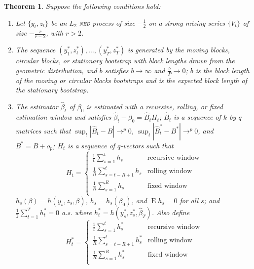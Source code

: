 \documentclass[11pt,fleqn]{article}
\newtheorem{thm}{Theorem}
\theoremstyle{definition}
\DeclareMathOperator{\E}{E}
\newcommand{\ned}{\textsc{ned}}
\begin{document}
\begin{thm}\label{res:3}
  Suppose the following conditions hold:
  \begin{enumerate}
  \item Let $\{y_t, z_t\}$ be an $L_2$-\textsl{\ned} process of size $-\frac12$ on
    a strong mixing series $\{V_t\}$ of size $-\frac{r}{r-2}$, with $r
    > 2$.
  \item The sequence $(y_1^{*}, z_t^*),\dots,(y_T^{*}, z_T^*)$ is
    generated by the moving blocks, circular blocks, or stationary
    bootstrap with block lengths drawn from the geometric
    distribution, and $b$ satisfies $b \to \infty$ and $\frac{b}{P}
    \to 0$; $b$ is the block length of the moving or circular blocks
    bootstraps and is the expected block length of the stationary
    bootstrap.
  \item The estimator $\hat{\beta}_t$ of $\beta_0$ is estimated with a
    recursive, rolling, or fixed estimation window and satisfies
    $\hat{\beta}_{t} - \beta_{0} = \hat{B}_{t} H_t$; $\hat{B}_{t}$ is
    a sequence of $k$ by $q$ matrices such that $\sup_t |\hat{B}_t -
    B| \to^p 0$, $\sup_t |\hat{B}_t^{*} - B^{*}| \to^p 0$, and $B^{*}
    = B + o_p$; $H_{t}$ is a sequence of $q$-vectors such that 
    \begin{equation}
      H_{t} = \begin{cases} 
        \tfrac1t \sum_{s=1}^t h_{s} & \text{recursive window} \\
        \tfrac1R \sum_{s=t-R+1}^t h_{s} & \text{rolling window} \\
        \tfrac1R \sum_{s=1}^R h_{s} & \text{fixed window} \\
      \end{cases}
    \end{equation}
    $h_{s}(\beta) = h(y_{s}, z_{s}, \beta)$, $h_s = h_s(\beta_0)$, and
    $\E h_{s} = 0$ for all $s$; and $\frac12 \sum_{t=1}^T h_t^* = 0$
    a.s. where $h_t^* = h(y_s^*, z_s^*, \hat\beta_T)$.  Also define
    \begin{equation}
      H_{t}^* = \begin{cases} 
        \tfrac1t \sum_{s=1}^t h_{s}^* & \text{recursive window} \\
        \tfrac1R \sum_{s=t-R+1}^t h_{s}^* & \text{rolling window} \\
        \tfrac1R \sum_{s=1}^R h_{s}^* & \text{fixed window} \\
      \end{cases}
    \end{equation}

\end{enumerate}
\end{thm}
\end{document}
